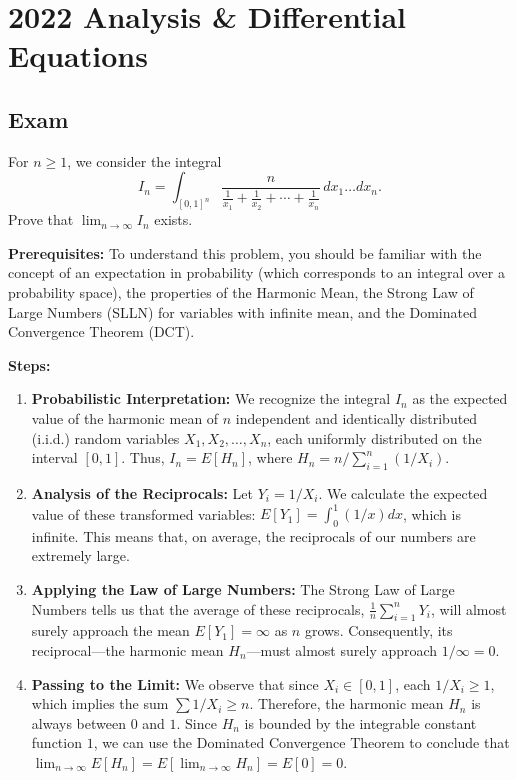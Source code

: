 \section{2022 Analysis \& Differential Equations}

\subsection{Exam}

\begin{exercise}
\label{analysis:2022:1}
For $n\geq 1$, we consider the integral
\[
I_n = \int_{[0,1]^n} \frac{n}{\frac{1}{x_1}+\frac{1}{x_2}+\cdots+\frac{1}{x_n}}\,dx_1\dots dx_n.
\]
Prove that $\lim_{n\to\infty} I_n$ exists.
\end{exercise}

\begin{solution}
\textbf{Prerequisites:}
To understand this problem, you should be familiar with the concept of an expectation in probability (which corresponds to an integral over a probability space), the properties of the Harmonic Mean, the Strong Law of Large Numbers (SLLN) for variables with infinite mean, and the Dominated Convergence Theorem (DCT).


\textbf{Steps:}
\begin{enumerate}
    \item \textbf{Probabilistic Interpretation:} We recognize the integral $I_n$ as the expected value of the harmonic mean of $n$ independent and identically distributed (i.i.d.) random variables $X_1, X_2, \dots, X_n$, each uniformly distributed on the interval $[0,1]$. Thus, $I_n = E[H_n]$, where $H_n = n / \sum_{i=1}^n (1/X_i)$.

    \item \textbf{Analysis of the Reciprocals:} Let $Y_i = 1/X_i$. We calculate the expected value of these transformed variables: $E[Y_1] = \int_0^1 (1/x) dx$, which is infinite. This means that, on average, the reciprocals of our numbers are extremely large.

    \item \textbf{Applying the Law of Large Numbers:} The Strong Law of Large Numbers tells us that the average of these reciprocals, $\frac{1}{n} \sum_{i=1}^n Y_i$, will almost surely approach the mean $E[Y_1] = \infty$ as $n$ grows. Consequently, its reciprocal—the harmonic mean $H_n$—must almost surely approach $1/\infty = 0$.

    \item \textbf{Passing to the Limit:} We observe that since $X_i \in [0,1]$, each $1/X_i \geq 1$, which implies the sum $\sum 1/X_i \geq n$. Therefore, the harmonic mean $H_n$ is always between $0$ and $1$. Since $H_n$ is bounded by the integrable constant function $1$, we can use the Dominated Convergence Theorem to conclude that $\lim_{n\to\infty} E[H_n] = E[\lim_{n\to\infty} H_n] = E[0] = 0$.
\end{enumerate}



\end{solution}
